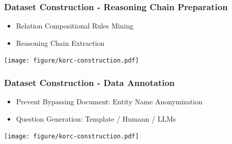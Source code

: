 \documentclass{beamer}
\begin{document}
\begin{frame}
\frametitle{Dataset Construction - Reasoning Chain Preparation}

\begin{itemize}
    \item Relation Compositional Rules Mining
    \item Reasoning Chain Extraction
\end{itemize}
\begin{center}
    \texttt{[image: figure/korc-construction.pdf]}
\end{center}

\end{frame}

\begin{frame}
\frametitle{Dataset Construction - Data Annotation}
\begin{itemize}
    \item Prevent Bypassing Document: Entity Name Anonymization
    \item Question Generation: Template / Humann / LLMs
\end{itemize}
\begin{center}
    \texttt{[image: figure/korc-construction.pdf]}
\end{center}
\end{frame}
\end{document}
